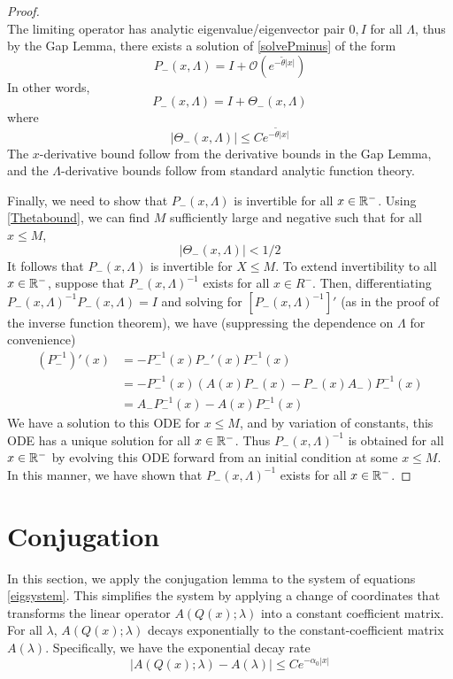 \documentclass[thesis.tex]{subfiles}
\begin{document}
\begin{lemma}
\begin{proof}
\[\]
The limiting operator has analytic eigenvalue/eigenvector pair $0, I$ for all $\Lambda$, thus by the Gap Lemma, there exists a solution of \eqref{solvePminus} of the form 
\begin{equation*}
P_-(x, \Lambda) = I + \mathcal{O}(e^{-\tilde{\theta}|x|})
\end{equation*}
In other words, 
\begin{equation*}
P_-(x, \Lambda) = I + \Theta_-(x, \Lambda)
\end{equation*}
where 
\begin{equation}\label{Thetabound}
|\Theta_-(x, \Lambda)| \leq C e^{-\tilde{\theta}|x|}
\end{equation}
The $x$-derivative bound follow from the derivative bounds in the Gap Lemma, and the $\Lambda$-derivative bounds follow from standard analytic function theory.

Finally, we need to show that $P_-(x, \Lambda)$ is invertible for all $x \in \mathbb{R}^-$. Using \eqref{Thetabound}, we can find $M$ sufficiently large and negative such that for all $x \leq M$,
\[
|\Theta_-(x, \Lambda)| < 1/2
\]
It follows that $P_-(x, \Lambda)$ is invertible for $X \leq M$. To extend invertibility to all $x \in \mathbb{R}^-$, suppose that $P_-(x, \Lambda)^{-1}$ exists for all $x \in R^-$. Then, differentiating $P_-(x, \Lambda)^{-1} P_-(x, \Lambda) = I$ and solving for $[P_-(x, \Lambda)^{-1}]'$ (as in the proof of the inverse function theorem), we have (suppressing the dependence on $\Lambda$ for convenience)
\begin{align*}
(P_-^{-1})'(x) &= -P_-^{-1}(x)P_-'(x)P_-^{-1}(x) \\
&= -P_-^{-1}(x)( A(x)P_-(x) - P_-(x) A_-)P_-^{-1}(x) \\
&= A_- P_-^{-1}(x) - A(x) P_-^{-1}(x)
\end{align*}
We have a solution to this ODE for $x \leq M$, and by variation of constants, this ODE has a unique solution for all $x \in \mathbb{R}^-$. Thus $P_-(x, \Lambda)^{-1}$ is obtained for all $x \in \mathbb{R}^-$ by evolving this ODE forward from an initial condition at some $x \leq M$. In this manner, we have shown that $P_-(x, \Lambda)^{-1}$ exists for all $x \in \mathbb{R}^-$.
\end{proof}
\end{lemma}

\section{Conjugation}

In this section, we apply the conjugation lemma to the system of equations \cref{eigsystem}. This simplifies the system by applying a change of coordinates that transforms the linear operator $A(Q(x); \lambda)$ into a constant coefficient matrix. For all $\lambda$, $A(Q(x); \lambda)$ decays exponentially to the constant-coefficient matrix $A(\lambda)$. Specifically, we have the exponential decay rate
\[
|A(Q(x); \lambda) - A(\lambda)| \leq C e^{-\alpha_0 |x|}
\]
\end{document}
